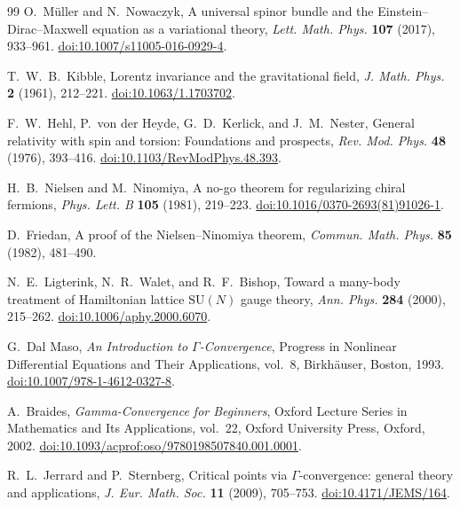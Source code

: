 \documentclass[11pt]{article}
\numberwithin{equation}{section}
\theoremstyle{definition}
\theoremstyle{remark}
\begin{document}
\begin{thebibliography}{99}
O.~M\"uller and N.~Nowaczyk,
A universal spinor bundle and the Einstein--Dirac--Maxwell equation as a variational theory,
\emph{Lett. Math. Phys.} \textbf{107} (2017), 933--961.
\href{https://doi.org/10.1007/s11005-016-0929-4}{doi:10.1007/s11005-016-0929-4}.

T.~W.~B.~Kibble,
Lorentz invariance and the gravitational field,
\emph{J. Math. Phys.} \textbf{2} (1961), 212--221.
\href{https://doi.org/10.1063/1.1703702}{doi:10.1063/1.1703702}.

F.~W.~Hehl, P.~von der Heyde, G.~D.~Kerlick, and J.~M.~Nester,
General relativity with spin and torsion: Foundations and prospects,
\emph{Rev. Mod. Phys.} \textbf{48} (1976), 393--416.
\href{https://doi.org/10.1103/RevModPhys.48.393}{doi:10.1103/RevModPhys.48.393}.

H.~B.~Nielsen and M.~Ninomiya,
A no-go theorem for regularizing chiral fermions,
\emph{Phys. Lett. B} \textbf{105} (1981), 219--223.
\href{https://doi.org/10.1016/0370-2693(81)91026-1}{doi:10.1016/0370-2693(81)91026-1}.

D.~Friedan,
A proof of the Nielsen--Ninomiya theorem,
\emph{Commun. Math. Phys.} \textbf{85} (1982), 481--490.

N.~E.~Ligterink, N.~R.~Walet, and R.~F.~Bishop,
Toward a many-body treatment of Hamiltonian lattice $\mathrm{SU}(N)$ gauge theory,
\emph{Ann. Phys.} \textbf{284} (2000), 215--262.
\href{https://doi.org/10.1006/aphy.2000.6070}{doi:10.1006/aphy.2000.6070}.

G.~Dal Maso,
\emph{An Introduction to $\Gamma$-Convergence},
Progress in Nonlinear Differential Equations and Their Applications,
vol.~8, Birkh\"auser, Boston, 1993.
\href{https://doi.org/10.1007/978-1-4612-0327-8}{doi:10.1007/978-1-4612-0327-8}.

A.~Braides,
\emph{Gamma-Convergence for Beginners},
Oxford Lecture Series in Mathematics and Its Applications, vol.~22,
Oxford University Press, Oxford, 2002.
\href{https://doi.org/10.1093/acprof:oso/9780198507840.001.0001}{doi:10.1093/acprof:oso/9780198507840.001.0001}.

R.~L.~Jerrard and P.~Sternberg,
Critical points via $\Gamma$-convergence: general theory and applications,
\emph{J. Eur. Math. Soc.} \textbf{11} (2009), 705--753.
\href{https://doi.org/10.4171/JEMS/164}{doi:10.4171/JEMS/164}.


\end{thebibliography}
\end{document}
